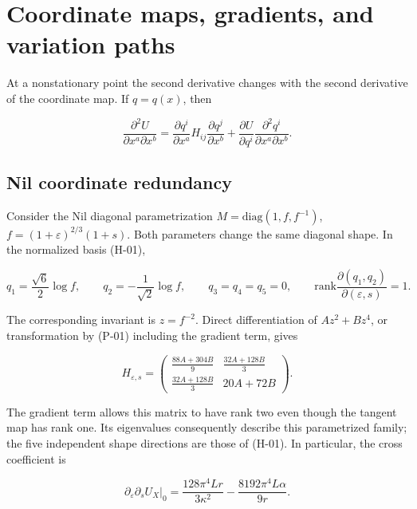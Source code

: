 \section{Coordinate maps, gradients, and variation paths}

At a nonstationary point the second derivative changes with the second derivative of the coordinate map. If $q=q(x)$, then

\begin{equation}\tag{P-01}\label{eq:P-01}
\frac{\partial^2U}{\partial x^a\partial x^b}
=\frac{\partial q^i}{\partial x^a}H_{ij}\frac{\partial q^j}{\partial x^b}
+\frac{\partial U}{\partial q^i}\frac{\partial^2q^i}{\partial x^a\partial x^b}.
\end{equation}

\subsection{Nil coordinate redundancy}

Consider the Nil diagonal parametrization $M=\mathrm{diag}(1,f,f^{-1})$, $f=(1+\varepsilon)^{2/3}(1+s)$. Both parameters change the same diagonal shape. In the normalized basis (H-01),

\begin{equation}\tag{P-02}\label{eq:P-02}
q_1=\frac{\sqrt6}{2}\log f,\qquad q_2=-\frac{1}{\sqrt2}\log f,
\qquad q_3=q_4=q_5=0,\qquad
\mathrm{rank}\frac{\partial(q_1,q_2)}{\partial(\varepsilon,s)}=1.
\end{equation}

The corresponding invariant is $z=f^{-2}$. Direct differentiation of $Az^2+Bz^4$, or transformation by (P-01) including the gradient term, gives

\begin{equation}\tag{P-03}\label{eq:P-03}
H_{\varepsilon,s}
=\begin{pmatrix}
\frac{88A+304B}{9}&\frac{32A+128B}{3}\\
\frac{32A+128B}{3}&20A+72B
\end{pmatrix}.
\end{equation}

The gradient term allows this matrix to have rank two even though the tangent map has rank one. Its eigenvalues consequently describe this parametrized family; the five independent shape directions are those of (H-01). In particular, the cross coefficient is

\begin{equation}\tag{P-04}\label{eq:P-04}
\left.\partial_\varepsilon\partial_sU_X\right|_0
=\frac{128\pi^4Lr}{3\kappa^2}
-\frac{8192\pi^4L\alpha}{9r}.
\end{equation}

